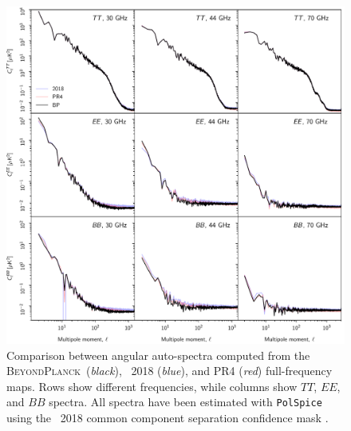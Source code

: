 \documentclass[twocolumn]{aa}
\newcommand{\BP}{\textsc{BeyondPlanck}}
\begin{document}
\begin{figure}[t]
  \center
  \includegraphics[width=\linewidth]{figs/cls_bp_npipe_dpc_BP10.pdf}
  \caption{Comparison between angular auto-spectra computed from the \BP\
    (\emph{black}), \Planck\ 2018 (\emph{blue}), and PR4 (\emph{red})
    full-frequency maps. Rows show different frequencies, while columns show
    $TT$, $EE$, and $BB$ spectra. All spectra have been estimated with
    \texttt{PolSpice} using the \Planck\ 2018 common component separation confidence mask \citep{planck2016-l04}.}\label{fig:powspec_full}
\end{figure}
\end{document}
